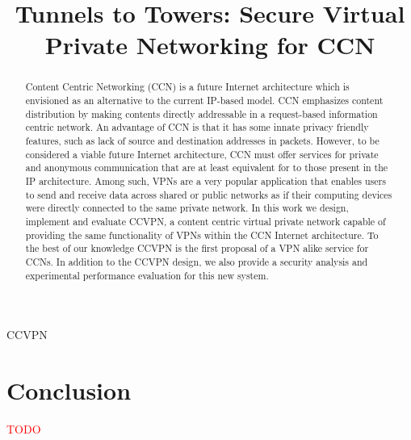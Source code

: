 \documentclass[conference,letterpaper,10pt]{IEEEtran}
\newcommand\todo[1]{\textcolor{red}{#1}}
\begin{document}
\title{Tunnels to Towers: Secure Virtual Private Networking for CCN}


\maketitle


\begin{abstract}
Content Centric Networking (CCN) is a future Internet architecture which is envisioned as an alternative to the current IP-based model. CCN emphasizes content distribution by making contents directly addressable in a request-based information centric network. An advantage of CCN is that it has some innate privacy friendly features, such as lack of source and destination addresses in packets. However, to be considered a viable future Internet architecture, CCN must offer services for private and anonymous communication that are at least equivalent for  to those present in the IP architecture. Among such, VPNs are a very popular application that enables users to send and receive data across shared or public networks as if their computing devices were directly connected to the same private network. In this work we design, implement and evaluate CCVPN, a content centric virtual private network capable of providing the same functionality of VPNs within the CCN Internet architecture. To the best of our knowledge CCVPN is the first proposal of a VPN alike service for CCNs. In addition to the CCVPN design, we also provide a security analysis and experimental performance evaluation for this new system.
\end{abstract}

\begin{IEEEkeywords}
CCVPN
\end{IEEEkeywords}

\IEEEpeerreviewmaketitle









\section{Conclusion}\label{conclusion}
\todo{TODO}

\ifCLASSOPTIONcaptionsoff
  \newpage
\fi

\tiny




\end{document}
